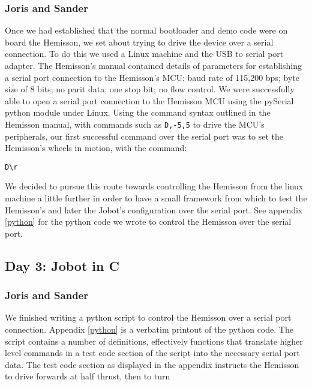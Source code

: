 \documentclass[a4paper, 12pt, titlepage]{article}
\begin{document}
\subsubsection{Joris and Sander} %

Once we had established that the normal bootloader and demo code were on board
the Hemisson, we set about trying to drive the device over a serial connection.
To do this we used a Linux machine and the USB to serial port adapter. The
Hemisson's manual contained details of parameters for establishing a serial port 
connection to the Hemisson's MCU: baud rate of 115,200 bps; byte size of 8 bits; 
no parit
data; one stop bit; no flow control. We were successfully able to open a serial
port connection to the Hemisson MCU using the pySerial python module under
Linux. Using the command syntax outlined in the Hemisson manual, with commands
such as \texttt{D,-5,5} to drive the MCU's peripherals, our first successful
command over the serial port was to set the Hemisson's wheels in motion, with
the command: 
\begin{verbatim}D\r\end{verbatim}
We decided to pursue this route towards controlling the Hemisson from the linux
machine a little further in order to have a small framework from which to test
the Hemisson's and later the Jobot's configuration over the serial port.
See appendix \ref{python} for the python code we wrote to
control the Hemisson over the serial port.



\subsection{Day 3: Jobot in C} %


\subsubsection{Joris and Sander} %

We finished writing a python script to control the Hemisson over a serial port 
connection. Appendix \ref{python} is a verbatim printout of the
python code. The script contains a number of definitions, effectively functions
that translate higher level commands in a test code section of the script into
the necessary serial port data. The test code section as displayed in the
appendix instructs the Hemisson to drive forwards at half thrust, then to turn 
\end{document}
